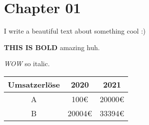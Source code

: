 \chapter{Chapter 01}

I write a beautiful text about something cool :)

\textbf{THIS IS BOLD} amazing huh.

\textit{WOW} so italic.

\begin{center}
	\begin{tabular}{ | c | c | c | }
        \hline
		Umsatzerlöse & 2020 & 2021 \\
        \hline
		A & 100€ & 20000€ \\
		B & 20004€ & 33394€ \\
        \hline
	\end{tabular}
\end{center}